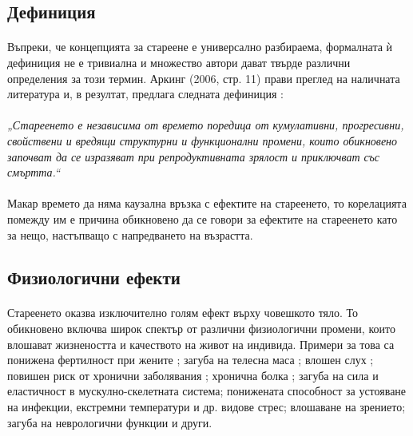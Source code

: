 \documentclass[pdftex,cyrillic,14pt,a4page,twoside,openright]{extreport}
\begin{document}
\subsection{Дефиниция}
\paragraph{}
Въпреки, че концепцията за стареене е универсално разбираема, формалната ѝ дефиниция не е тривиална и множество автори дават твърде различни определения за този термин. Аркинг (2006, стр. 11) прави преглед на наличната литература и, в резултат, предлага следната дефиниция \cite{arking2006biology}:

\paragraph{}
\textit{„Стареенето е независима от времето поредица от кумулативни, прогресивни, свойствени и вредящи структурни и функционални промени, които обикновено започват да се изразяват при репродуктивната зрялост и приключват със смъртта.“}

\paragraph{}
Макар времето да няма каузална връзка с ефектите на стареенето, то корелацията помежду им е причина обикновено да се говори за ефектите на стареенето като за нещо, настъпващо с напредването на възрастта.

\subsection{Физиологични ефекти}
\paragraph{}
Стареенето оказва изключително голям ефект върху човешкото тяло. То обикновено включва широк спектър от различни физиологични промени, които влошават жизнеността и качеството на живот на индивида. Примери за това са понижена фертилност при жените \cite{kamath2010}; загуба на телесна маса \cite{spencer1996}; влошен слух \cite{feder2015}; повишен риск от хронични заболявания \cite{larson2013, prasad2012}; хронична болка \cite{geriatrics2002}; загуба на сила и еластичност в мускулно-скелетната система; понижената способност за устояване на инфекции, екстремни температури и др. видове стрес; влошаване на зрението; загуба на неврологични функции \cite{vina2007} и други.
\end{document}
